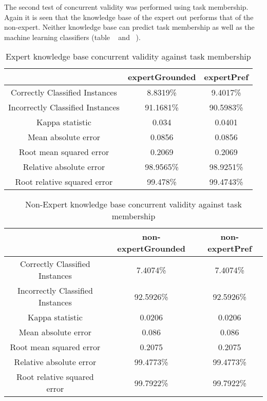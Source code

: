 The second test of concurrent validity was performed using task membership. Again it is seen that the knowledge base of the expert out performs that of the non-expert. Neither knowledge base can predict task membership as well as the machine learning classifiers (table ~\cite{tab:ecurrenttask} and ~\cite{tab:necurrenttask}). %

\begin{table}[!h]
\centering
\begin{tabular}{|c|c|c|}
                                 & expertGrounded  & expertPref \\ \hline
Correctly Classified Instances   & 8.8319\%      & 9.4017\% \\
Incorrectly Classified Instances & 91.1681\%     & 90.5983\% \\
Kappa statistic                  & 0.034         & 0.0401    \\
Mean absolute error              & 0.0856        & 0.0856    \\
Root mean squared error          & 0.2069        & 0.2069    \\
Relative absolute error          & 98.9565\%     & 98.9251\% \\
Root relative squared error      & 99.478\%      & 99.4743\% \\
\end{tabular}
\caption{Expert knowledge base concurrent validity against task membership}
\label{tab:ecurrenttask}
\end{table}

\begin{table}[!h]
\centering
\begin{tabular}{|c|c|c|}
                                 & non-expertGrounded  & non-expertPref \\ \hline
Correctly Classified Instances   & 7.4074\%         & 7.4074\%  \\
Incorrectly Classified Instances & 92.5926\%        & 92.5926\%  \\
Kappa statistic                  & 0.0206           & 0.0206  \\
Mean absolute error              & 0.086            & 0.086   \\
Root mean squared error          & 0.2075           & 0.2075  \\
Relative absolute error          & 99.4773\%       & 99.4773\%  \\
Root relative squared error      & 99.7922\%       & 99.7922\%  \\
\end{tabular}
\caption{Non-Expert knowledge base concurrent validity against task membership}
\label{tab:necurrenttask}
\end{table}

